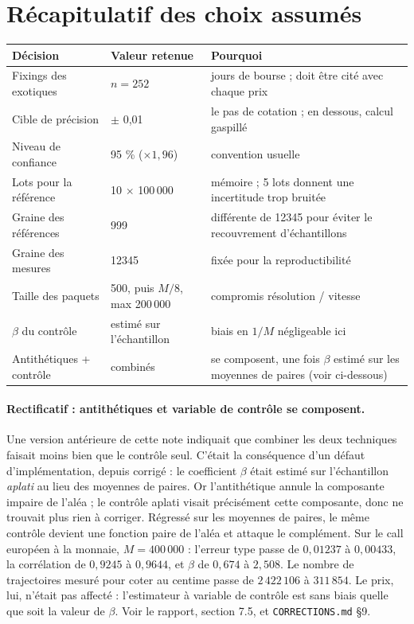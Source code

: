 \documentclass[11pt,a4paper]{article}
\begin{document}
\section{Récapitulatif des choix assumés}

\begin{center}
\small
\renewcommand{\arraystretch}{1.15}
\begin{tabular}{p{4.1cm}p{3.0cm}p{7.6cm}}
\toprule
Décision & Valeur retenue & Pourquoi \\
\midrule
Fixings des exotiques & $n = 252$ & jours de bourse ; doit être cité avec chaque prix \\
Cible de précision & $\pm$ 0,01 & le pas de cotation ; en dessous, calcul gaspillé \\
Niveau de confiance & 95 \% ($\times 1{,}96$) & convention usuelle \\
Lots pour la référence & 10 $\times$ 100\,000 & mémoire ; 5 lots donnent une incertitude trop bruitée \\
Graine des références & 999 & différente de 12345 pour éviter le recouvrement d'échantillons \\
Graine des mesures & 12345 & fixée pour la reproductibilité \\
Taille des paquets & 500, puis $M/8$, max 200\,000 & compromis résolution / vitesse \\
$\beta$ du contrôle & estimé sur l'échantillon & biais en $1/M$ négligeable ici \\
Antithétiques + contrôle & combinés & se composent, une fois $\beta$ estimé sur les moyennes de paires (voir ci-dessous) \\
\bottomrule
\end{tabular}
\end{center}

\paragraph{Rectificatif : antithétiques et variable de contrôle se composent.}
Une version antérieure de cette note indiquait que combiner les deux techniques
faisait moins bien que le contrôle seul. C'était la conséquence d'un défaut
d'implémentation, depuis corrigé : le coefficient $\beta$ était estimé sur
l'échantillon \emph{aplati} au lieu des moyennes de paires. Or l'antithétique
annule la composante impaire de l'aléa ; le contrôle aplati visait précisément
cette composante, donc ne trouvait plus rien à corriger. Régressé sur les
moyennes de paires, le même contrôle devient une fonction paire de l'aléa et
attaque le complément. Sur le call européen à la monnaie, $M=400\,000$ :
l'erreur type passe de $0{,}01237$ à $0{,}00433$, la corrélation de $0{,}9245$ à
$0{,}9644$, et $\beta$ de $0{,}674$ à $2{,}508$. Le nombre de trajectoires mesuré
pour coter au centime passe de $2\,422\,106$ à $311\,854$. Le prix, lui, n'était
pas affecté : l'estimateur à variable de contrôle est sans biais quelle que soit
la valeur de $\beta$. Voir le rapport, section 7.5, et
\texttt{CORRECTIONS.md} §9.
\end{document}
